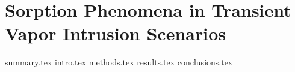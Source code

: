 \documentclass[../thesis.tex]{subfiles}
\begin{document}
\chapter{Sorption Phenomena in Transient Vapor Intrusion Scenarios}\label{chp:sorption}

{summary.tex}
{intro.tex}
{methods.tex}
{results.tex}
{conclusions.tex}
\end{document}
